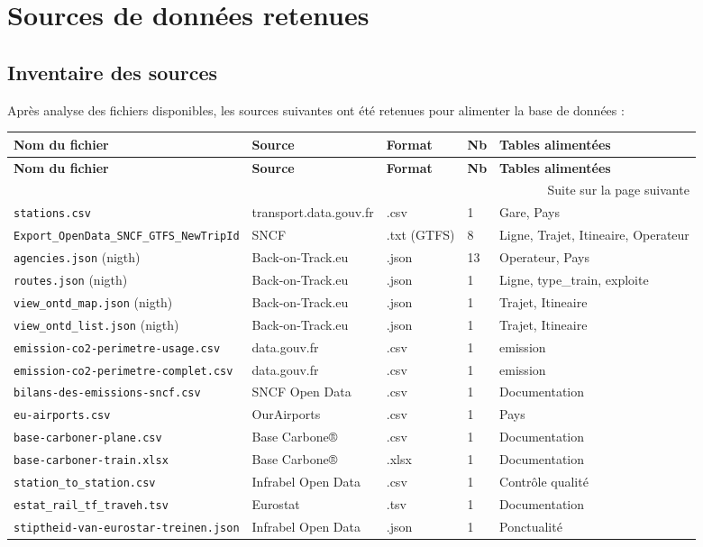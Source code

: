 \documentclass[12pt,a4paper]{article}
\begin{document}
\section{Sources de données retenues}

\subsection{Inventaire des sources}

Après analyse des fichiers disponibles, les sources suivantes ont été retenues pour alimenter la base de données :

\begin{longtable}{|p{3.5cm}|p{5cm}|p{1.5cm}|p{1.5cm}|p{2.5cm}|}
\hline
\textbf{Nom du fichier} & \textbf{Source} & \textbf{Format} & \textbf{Nb} & \textbf{Tables alimentées} \\
\hline
\endfirsthead
\hline
\textbf{Nom du fichier} & \textbf{Source} & \textbf{Format} & \textbf{Nb} & \textbf{Tables alimentées} \\
\hline
\endhead
\hline
\multicolumn{5}{|r|}{Suite sur la page suivante} \\
\hline
\endfoot
\hline
\endlastfoot

\texttt{stations.csv} & transport.data.gouv.fr & .csv & 1 & Gare, Pays \\
\hline
\texttt{Export\_OpenData\_SNCF\_GTFS\_NewTripId} & SNCF & .txt (GTFS) & 8 & Ligne, Trajet, Itineaire, Operateur \\
\hline
\texttt{agencies.json} (nigth) & Back-on-Track.eu & .json & 13 & Operateur, Pays \\
\hline
\texttt{routes.json} (nigth) & Back-on-Track.eu & .json & 1 & Ligne, type\_train, exploite \\
\hline
\texttt{view\_ontd\_map.json} (nigth) & Back-on-Track.eu & .json & 1 & Trajet, Itineaire \\
\hline
\texttt{view\_ontd\_list.json} (nigth) & Back-on-Track.eu & .json & 1 & Trajet, Itineaire \\
\hline
\texttt{emission-co2-perimetre-usage.csv} & data.gouv.fr & .csv & 1 & emission \\
\hline
\texttt{emission-co2-perimetre-complet.csv} & data.gouv.fr & .csv & 1 & emission \\
\hline
\texttt{bilans-des-emissions-sncf.csv} & SNCF Open Data & .csv & 1 & Documentation \\
\hline
\texttt{eu-airports.csv} & OurAirports & .csv & 1 & Pays \\
\hline
\texttt{base-carboner-plane.csv} & Base Carbone® & .csv & 1 & Documentation \\
\hline
\texttt{base-carboner-train.xlsx} & Base Carbone® & .xlsx & 1 & Documentation \\
\hline
\texttt{station\_to\_station.csv} & Infrabel Open Data & .csv & 1 & Contrôle qualité \\
\hline
\texttt{estat\_rail\_tf\_traveh.tsv} & Eurostat & .tsv & 1 & Documentation \\
\hline
\texttt{stiptheid-van-eurostar-treinen.json} & Infrabel Open Data & .json & 1 & Ponctualité \\
\hline
\end{longtable}
\end{document}
